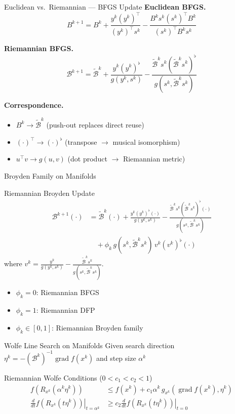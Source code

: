 \documentclass[10pt,aspectratio=169]{beamer}
\DeclareMathOperator{\grad}{grad}
\begin{document}
\begin{frame}{Euclidean vs.\ Riemannian --- BFGS Update}
\textbf{Euclidean BFGS.}
$$B^{k+1} = B^k + \frac{y^k(y^k)^\top}{(y^k)^\top s^k} - \frac{B^ks^k(s^k)^\top B^k}{(s^k)^\top B^ks^k}$$

\textbf{Riemannian BFGS.}
$$\mathcal{B}^{k+1} = \tilde{\mathcal{B}}^k + \frac{y^k(y^k)^\flat}{g(y^k,s^k)} - \frac{\tilde{\mathcal{B}}^ks^k(\tilde{\mathcal{B}}^ks^k)^\flat}{g(s^k,\tilde{\mathcal{B}}^ks^k)}$$

\bigskip
\textbf{Correspondence.}
\begin{itemize}
    \item $B^k \longrightarrow \tilde{\mathcal{B}}^k$ \quad (push-out replaces direct reuse)
    \item $(\cdot)^\top \longrightarrow (\cdot)^\flat$ \quad (transpose $\to$ musical isomorphism)
    \item $u^\top v \longrightarrow g(u,v)$ \quad (dot product $\to$ Riemannian metric)
\end{itemize}
\end{frame}

\begin{frame}{Broyden Family on Manifolds}
\begin{block}{Riemannian Broyden Update}
\begin{align*}
\mathcal{B}^{k+1}(\cdot) &= \tilde{\mathcal{B}}^k(\cdot) + \frac{y^k(y^k)^\flat(\cdot)}{g(y^k,s^k)} - \frac{\tilde{\mathcal{B}}^ks^k(\tilde{\mathcal{B}}^ks^k)^\flat(\cdot)}{g(s^k,\tilde{\mathcal{B}}^ks^k)}\\
&\quad + \phi_k\,g(s^k,\tilde{\mathcal{B}}^ks^k)\,v^k(v^k)^\flat(\cdot)
\end{align*}
where $v^k = \frac{y^k}{g(y^k,s^k)} - \frac{\tilde{\mathcal{B}}^ks^k}{g(s^k,\tilde{\mathcal{B}}^ks^k)}$.
\end{block}

\medskip
\begin{itemize}
    \item $\phi_k=0$: Riemannian BFGS
    \item $\phi_k=1$: Riemannian DFP
    \item $\phi_k\in[0,1]$: Riemannian Broyden family
\end{itemize}
\end{frame}

\begin{frame}{Wolfe Line Search on Manifolds}
Given search direction $\eta^k = -(\mathcal{B}^k)^{-1}\grad f(x^k)$ and step size $\alpha^k$
\begin{block}{Riemannian Wolfe Conditions ($0<c_1<c_2<1$)}
\begin{align*}
    f(R_{x^k}(\alpha^k\eta^k)) &\leq f(x^k) + c_1\alpha^k\,g_{x^k}(\grad f(x^k),\eta^k)\\[3pt]
    \left.\frac{d}{dt}f(R_{x^k}(t\eta^k))\right|_{t=\alpha^k} &\geq c_2\left.\frac{d}{dt}f(R_{x^k}(t\eta^k))\right|_{t=0}
\end{align*}
\end{block}
\end{frame}
\end{document}
